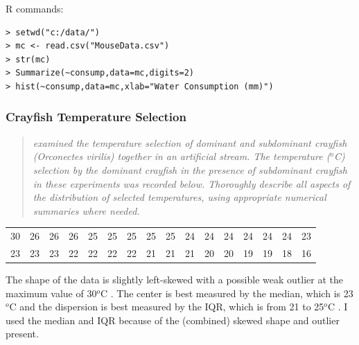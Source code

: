 \documentclass[10pt,openany]{book}\usepackage[]{graphicx}\usepackage[]{color}
\makeatletter
\newenvironment{kframe}{%
 \def\at@end@of@kframe{}%
 \ifinner\ifhmode%
  \def\at@end@of@kframe{\end{minipage}}%
  \begin{minipage}{\columnwidth}%
 \fi\fi%
 \def\FrameCommand##1{\hskip\@totalleftmargin \hskip-\fboxsep
 \colorbox{shadecolor}{##1}\hskip-\fboxsep
     \hskip-\linewidth \hskip-\@totalleftmargin \hskip\columnwidth}%
 \MakeFramed {\advance\hsize-\width
   \@totalleftmargin\z@ \linewidth\hsize
   \@setminipage}}%
 {\par\unskip\endMakeFramed%
 \at@end@of@kframe}
\newenvironment{knitrout}{}{} %
\makeatother
\begin{document}
\begin{minipage}{\textwidth}
R commands:
\begin{knitrout}
\color{fgcolor}\begin{kframe}
\begin{verbatim}
> setwd("c:/data/")
> mc <- read.csv("MouseData.csv")
> str(mc)
> Summarize(~consump,data=mc,digits=2)
> hist(~consump,data=mc,xlab="Water Consumption (mm)")
\end{verbatim}
\end{kframe}
\end{knitrout}
\end{minipage}

\subsubsection{Crayfish Temperature Selection}
\begin{quote}
\textit{\cite{Peck1985} examined the temperature selection of dominant and subdominant crayfish (\textit{Orconectes virilis}) together in an artificial stream.  The temperature ($^{o}$C) selection by the dominant crayfish in the presence of subdominant crayfish in these experiments was recorded below.  Thoroughly describe all aspects of the distribution of selected temperatures, using appropriate numerical summaries where needed.}
\end{quote}

\begin{tabular}{rrrrrrrrrrrrrrrr}
  30 & 26 & 26 & 26 & 25 & 25 & 25 & 25 & 25 & 24 & 24 & 24 & 24 & 24 & 24 & 23 \\ 
  23 & 23 & 23 & 22 & 22 & 22 & 22 & 21 & 21 & 21 & 20 & 20 & 19 & 19 & 18 & 16 \\ 
  \end{tabular}


The shape of the data is slightly left-skewed  with a possible weak outlier at the maximum value of 30$^{o}$C .  The center is best measured by the median, which is 23$^{o}$C  and the dispersion is best measured by the IQR, which is from 21 to 25$^{o}$C .  I used the median and IQR because of the (combined) skewed shape and outlier present.
\end{document}
